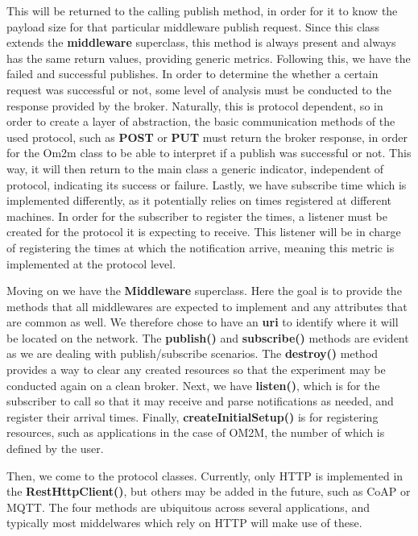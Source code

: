 \documentclass[conference]{IEEEtran}
\begin{document}
This will be returned to the calling publish method, in order for it to know the payload size for that particular middleware publish request. Since this class extends the \textbf{middleware} superclass, this method is always present and always has the same return values, providing generic metrics.
Following this, we have the failed and successful publishes. In order to determine the whether a certain request was successful or not, some level of analysis must be conducted to the response provided by the broker. Naturally, this is protocol dependent, so in order to create a layer of abstraction, the basic communication methods of the used protocol, such as \textbf{POST} or \textbf{PUT} must return the broker response, in order for the Om2m class to be able to interpret if a publish was successful or not. This way, it will then return to the main class a generic indicator, independent of protocol, indicating its success or failure. 
Lastly, we have subscribe time which is implemented differently, as it potentially relies on times registered at different machines. In order for the subscriber to register the times, a listener must be created for the protocol it is expecting to receive. This listener will be in charge of registering the times at which the notification arrive, meaning this metric is implemented at the protocol level.

Moving on we have the \textbf{Middleware} superclass. Here the goal is to provide the methods that all middlewares are expected to implement and any attributes that are common as well. We therefore chose to have an \textbf{uri} to identify where it will be located on the network. The \textbf{publish()} and \textbf{subscribe()} methods are evident as we are dealing with publish/subscribe scenarios. The \textbf{destroy()} method provides a way to clear any created resources so that the experiment may be conducted again on a clean broker. Next, we have \textbf{listen()}, which is for the subscriber to call so that it may receive and parse notifications as needed, and register their arrival times. Finally, \textbf{createInitialSetup()} is for registering resources, such as applications in the case of OM2M, the number of which is defined by the user.

Then, we come to the protocol classes. Currently, only HTTP is implemented in the \textbf{RestHttpClient()}, but others may be added in the future, such as CoAP or MQTT\@. The four methods are ubiquitous across several applications, and typically most middelwares which rely on HTTP will make use of these. 
\end{document}
